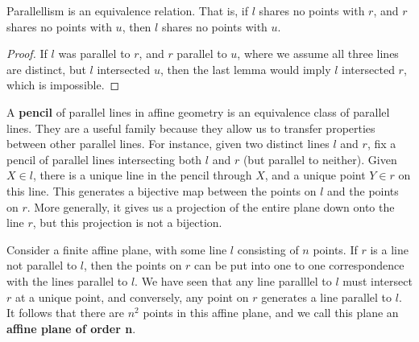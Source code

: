 \begin{corollary}
    Parallellism is an equivalence relation. That is, if $l$ shares no points with $r$, and $r$ shares no points with $u$, then $l$ shares no points with $u$.
\end{corollary}
\begin{proof}
    If $l$ was parallel to $r$, and $r$  parallel to $u$, where we assume all three lines are distinct, but $l$ intersected $u$, then the last lemma would imply $l$ intersected $r$, which is impossible.
\end{proof}

A {\bf pencil} of parallel lines in affine geometry is an equivalence class of parallel lines. They are a useful family because they allow us to transfer properties between other parallel lines. For instance, given two distinct lines $l$ and $r$, fix a pencil of parallel lines intersecting both $l$ and $r$ (but parallel to neither). Given $X \in l$, there is a unique line in the pencil through $X$, and a unique point $Y \in r$ on this line. This generates a bijective map between the points on $l$ and the points on $r$. More generally, it gives us a projection of the entire plane down onto the line $r$, but this projection is not a bijection.

\begin{example}
    Consider a finite affine plane, with some line $l$ consisting of $n$ points. If $r$ is a line not parallel to $l$, then the points on $r$ can be put into one to one correspondence with the lines parallel to $l$. We have seen that any line paralllel to $l$ must intersect $r$ at a unique point, and conversely, any point on $r$ generates a line parallel to $l$. It follows that there are $n^2$ points in this affine plane, and we call this plane an {\bf affine plane of order n}.
\end{example}

